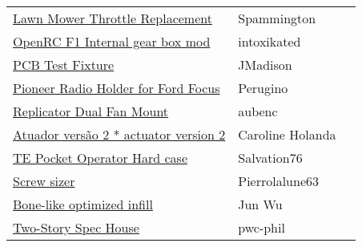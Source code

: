 \begin{table}
\begin{tabular}{l l l}
\href{https://www.thingiverse.com/thing:2752165}{\ssize Lawn Mower Throttle Replacement} & \ssize Spammington\\
\href{https://www.thingiverse.com/thing:2854328}{\ssize OpenRC F1 Internal gear box mod} & \ssize intoxikated\\
\href{https://www.thingiverse.com/thing:3592328}{\ssize PCB Test Fixture} & \ssize JMadison\\
\href{https://www.thingiverse.com/thing:1078865}{\ssize Pioneer Radio Holder for Ford Focus} & \ssize Perugino\\
\href{https://www.thingiverse.com/thing:34596}{\ssize Replicator Dual Fan Mount} & \ssize aubenc\\
\href{https://www.thingiverse.com/thing:3754728}{\ssize Atuador versão 2 * actuator version 2} & \ssize Caroline Holanda\\
\href{https://www.thingiverse.com/thing:1595179}{\ssize TE Pocket Operator Hard case} & \ssize Salvation76\\
\href{https://www.thingiverse.com/thing:3682303}{\ssize Screw sizer} & \ssize Pierrolalune63\\
\href{http://homepage.tudelft.nl/z0s1z/projects/2017-bone-infill.html}{\ssize Bone-like optimized infill} & \ssize Jun Wu\\
\href{https://www.thingiverse.com/thing:26244}{\ssize Two-Story Spec House} & \ssize pwc-phil\\

\end{tabular}
\end{table}
